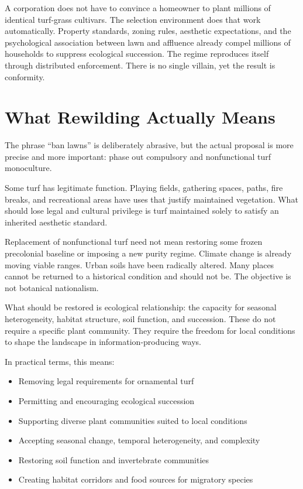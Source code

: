 \documentclass[12pt]{article}
\begin{document}
A corporation does not have to convince a homeowner to plant millions of identical turf-grass cultivars. The selection environment does that work automatically. Property standards, zoning rules, aesthetic expectations, and the psychological association between lawn and affluence already compel millions of households to suppress ecological succession. The regime reproduces itself through distributed enforcement. There is no single villain, yet the result is conformity.

\section{What Rewilding Actually Means}

The phrase ``ban lawns'' is deliberately abrasive, but the actual proposal is more precise and more important: phase out compulsory and nonfunctional turf monoculture.

Some turf has legitimate function. Playing fields, gathering spaces, paths, fire breaks, and recreational areas have uses that justify maintained vegetation. What should lose legal and cultural privilege is turf maintained solely to satisfy an inherited aesthetic standard.

Replacement of nonfunctional turf need not mean restoring some frozen precolonial baseline or imposing a new purity regime. Climate change is already moving viable ranges. Urban soils have been radically altered. Many places cannot be returned to a historical condition and should not be. The objective is not botanical nationalism.

What should be restored is ecological relationship: the capacity for seasonal heterogeneity, habitat structure, soil function, and succession. These do not require a specific plant community. They require the freedom for local conditions to shape the landscape in information-producing ways.

In practical terms, this means:
\begin{itemize}
\item Removing legal requirements for ornamental turf
\item Permitting and encouraging ecological succession
\item Supporting diverse plant communities suited to local conditions
\item Accepting seasonal change, temporal heterogeneity, and complexity
\item Restoring soil function and invertebrate communities
\item Creating habitat corridors and food sources for migratory species
\end{itemize}
\end{document}
